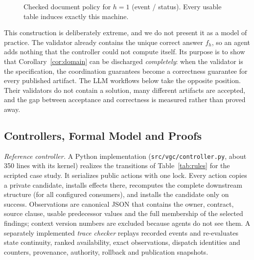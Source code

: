 \begin{figure}[!t]
\centering
{}%
\caption{Checked document policy for $h=1$ (event / status). Every usable table induces exactly this machine.}\label{fig:policy}
\end{figure}

This construction is deliberately extreme, and we do not present it as a model of practice. The validator already contains the unique correct answer $f_h$, so an agent adds nothing that the controller could not compute itself. Its purpose is to show that Corollary~\ref{cor:domain} can be discharged \emph{completely}: when the validator is the specification, the coordination guarantees become a correctness guarantee for every published artifact. The LLM workflows below take the opposite position. Their validators do not contain a solution, many different artifacts are accepted, and the gap between acceptance and correctness is measured rather than proved away.

\subsection{Controllers, Formal Model and Proofs}\label{sec:artifact}
\emph{Reference controller.} A Python implementation (\texttt{src/vgc/controller.py}, about 350 lines with its kernel) realizes the transitions of Table~\ref{tab:rules} for the scripted case study. It serializes public actions with one lock. Every action copies a private candidate, installs effects there, recomputes the complete downstream structure (for all configured consumers), and installs the candidate only on success. Observations are canonical JSON that contains the owner, contract, source clause, usable predecessor values and the full membership of the selected findings; context version numbers are excluded because agents do not see them. A separately implemented \emph{trace checker} replays recorded events and re-evaluates state continuity, ranked availability, exact observations, dispatch identities and counters, provenance, authority, rollback and publication snapshots.


